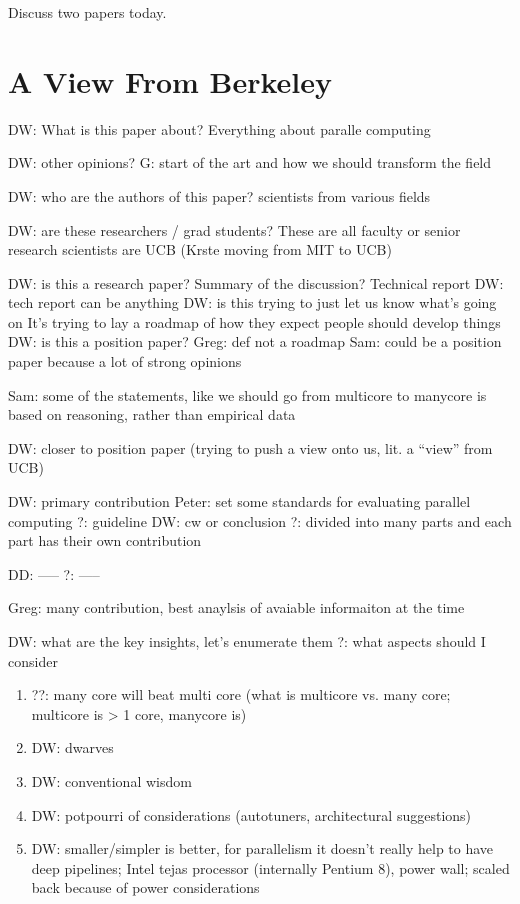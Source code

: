 



Discuss two papers today.

\section{A View From Berkeley}
DW: What is this paper about?
Everything about paralle computing

DW: other opinions?
G: start of the art and how we should transform the field

DW: who are the authors of this paper?
scientists from various fields

DW: are these researchers / grad students?
These are all faculty or senior research scientists are UCB (Krste moving from MIT to UCB)

DW: is this a research paper?
Summary of the discussion?
Technical report
DW: tech report can be anything
DW: is this trying to just let us know what's going on
It's trying to lay a roadmap of how they expect people should develop things
DW: is this a position paper?
Greg: def not a roadmap
Sam: could be a position paper because a lot of strong opinions

Sam: some of the statements, like we should go from multicore to manycore is based on reasoning, rather than empirical data

DW: closer to position paper (trying to push a view onto us, lit. a ``view'' from UCB)

DW: primary contribution
Peter: set some standards for evaluating parallel computing
?: guideline
DW: cw or conclusion
?: divided into many parts and each part has their own contribution

DD: -----
?: -----

Greg: many contribution, best anaylsis of avaiable informaiton at the time

DW: what are the key insights, let's enumerate them
?: what aspects should I consider
\begin{enumerate}
    \item ??: many core will beat multi core (what is multicore vs. many core; multicore is > 1 core, manycore is)
    \item DW: dwarves
    \item DW: conventional wisdom
    \item DW: potpourri of considerations (autotuners, architectural suggestions)
    \item DW: smaller/simpler is better, for parallelism it doesn't really help to have deep pipelines; Intel tejas processor (internally Pentium 8), power wall; scaled back because of power considerations
\end{enumerate}

